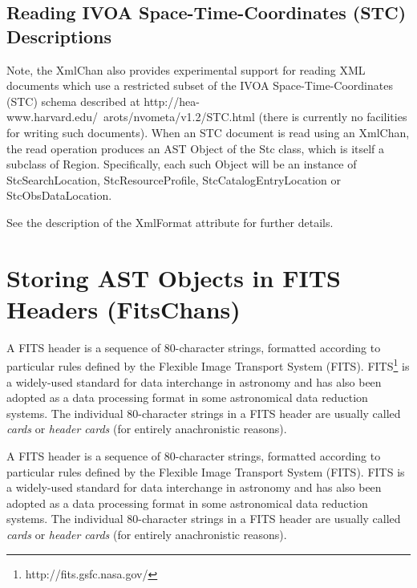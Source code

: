 \documentclass[twoside,11pt]{article}
\newcommand{\htmladdnormallink}[2]{#1}
\newenvironment{latexonly}{}{}
\begin{document}
\subsection{Reading IVOA Space-Time-Coordinates (STC) Descriptions}
Note, the XmlChan also provides experimental support for reading XML documents
which use a restricted subset of the IVOA Space-Time-Coordinates (STC) schema
described at \htmladdnormallink{
http://hea-www.harvard.edu/~arots/nvometa/v1.2/STC.html 
}{
http://hea-www.harvard.edu/~arots/nvometa/v1.2/STC.html 
} (there is currently no facilities for writing such documents). When an
STC document is read using an XmlChan, the read operation produces an AST
Object of the Stc class, which is itself a subclass of Region. Specifically, 
each such Object will be an instance of StcSearchLocation, StcResourceProfile,
StcCatalogEntryLocation or StcObsDataLocation.

See the description of the XmlFormat attribute for further details.

\cleardoublepage
\section{\label{ss:nativefits}Storing AST Objects in FITS Headers (FitsChans)}

\begin{latexonly}
A FITS header is a sequence of 80-character strings, formatted
according to particular rules defined by the Flexible Image Transport
System
(FITS). FITS\footnote{http://fits.gsfc.nasa.gov/}
is a widely-used standard for data interchange in astronomy and has
also been adopted as a data processing format in some astronomical
data reduction systems.  The individual 80-character strings in a FITS
header are usually called {\em{cards}} or {\em{header cards}} (for
entirely anachronistic reasons).
\end{latexonly}
\begin{htmlonly}
A FITS header is a sequence of 80-character strings, formatted
according to particular rules defined by the Flexible Image Transport
System (FITS).
\htmladdnormallink{FITS}{http://fits.gsfc.nasa.gov/}
is a widely-used standard for data interchange in astronomy and has
also been adopted as a data processing format in some astronomical
data reduction systems.  The individual 80-character strings in a FITS
header are usually called {\em{cards}} or {\em{header cards}} (for
entirely anachronistic reasons).
\end{htmlonly}
\end{document}
